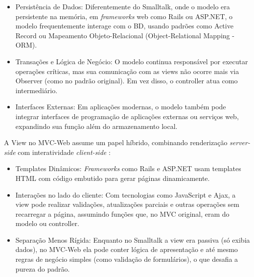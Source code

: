         \begin{itemize}
            \item Persistência de Dados: Diferentemente do Smalltalk, onde o modelo era persistente na memória, em \textit{frameworks} web como Rails ou ASP.NET, o modelo frequentemente interage com o BD, usando padrões como Active Record ou Mapeamento Objeto-Relacional (Object-Relational Mapping - ORM).
            
            \item Transações e Lógica de Negócio: O modelo continua responsável por executar operações críticas, mas sua comunicação com as views não ocorre mais via Observer (como no padrão original). Em vez disso, o controller atua como intermediário.
            
            \item Interfaces Externas: Em aplicações modernas, o modelo também pode integrar interfaces de programação de aplicações externas ou serviços web, expandindo sua função além do armazenamento local.
        \end{itemize}
    
    
    
        \par A View no MVC-Web assume um papel híbrido, combinando renderização \textit{server-side} com interatividade \textit{client-side} \cite{inproceedings:grove:2011}: 
    
        \begin{itemize}
            \item Templates Dinâmicos: \textit{Frameworks} como Rails e ASP.NET usam templates HTML com código embutido para gerar páginas dinamicamente.
    
            \item Interações no lado do cliente: Com tecnologias como JavaScript e Ajax, a view pode realizar validações, atualizações parciais e outras operações sem recarregar a página, assumindo funções que, no MVC original, eram do modelo ou controller.
    
            \item Separação Menos Rígida: Enquanto no Smalltalk a view era passiva (só exibia dados), no MVC-Web ela pode conter lógica de apresentação e até mesmo regras de negócio simples (como validação de formulários), o que desafia a pureza do padrão.
        \end{itemize}
        
       
        
